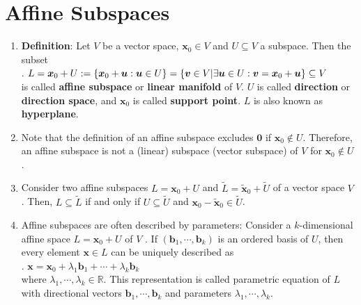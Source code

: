 \section{Affine Subspaces}

\begin{enumerate}
    \item \textbf{Definition}: Let $V$ be a vector space, $\bm{x}_0 \in V$ and $U \subseteq V$ a subspace. 
    Then the subset 
    \hfill \cite{mfml/book/mml/Deisenroth-Faisal-Ong}
    \\
    .\hfill
    $
        L 
        = \bm{x}_0 + U 
        := \left\{\bm{x}_0 + \bm{u} : \bm{u} \in  U\right\}
        = \left\{\bm{v} \in  V | \exists \bm{u} \in  U : \bm{v} = \bm{x}_0 + \bm{u}\right\} \subseteq V
    $
    \hfill \cite{mfml/book/mml/Deisenroth-Faisal-Ong}
    \\
    is called \textbf{affine subspace} or \textbf{linear manifold} of $V$.
    $U$ is called \textbf{direction} or \textbf{direction space}, and $\bm{x}_0$ is called \textbf{support point}.
    $L$ is also known as \textbf{hyperplane}.
    \hfill \cite{mfml/book/mml/Deisenroth-Faisal-Ong}

    \item Note that the definition of an affine subspace excludes $\bm{0}$ if $\bm{x}_0 \notin U$.
    Therefore, an affine subspace is not a (linear) subspace (vector subspace) of $V$ for $\bm{x}_0 \notin U$.
    \hfill \cite{mfml/book/mml/Deisenroth-Faisal-Ong}

    \item Consider two affine subspaces $L = \bm{x}_0 + U$ and $\tilde{L} = \tilde{\bm{x}}_0 + \tilde{U}$ of a vector space $V$ . 
    Then, $L \subseteq \tilde{L}$ if and only if $U \subseteq \tilde{U}$ and $\bm{x}_0 - \tilde{\bm{x}}_0 \in \tilde{U}$.
    \hfill \cite{mfml/book/mml/Deisenroth-Faisal-Ong}

    \item Affine subspaces are often described by parameters: Consider a $k$-dimensional affine space $L = \bm{x}_0 + U$ of $V$ . 
    If $(\bm{b}_1, \cdots , \bm{b}_k)$ is an ordered basis of $U$, then every element $\bm{x} \in L$ can be uniquely described as
    \hfill \cite{mfml/book/mml/Deisenroth-Faisal-Ong}
    \\
    .\hfill
    $
        \bm{x} = \bm{x}_0 + \lambda _1 \bm{b}_1 + \cdots + \lambda _k \bm{b}_k
    $
    \hfill \cite{mfml/book/mml/Deisenroth-Faisal-Ong}
    \\
    where $\lambda _1, \cdots , \lambda _k \in \mathbb{R}$. 
    This representation is called parametric equation of $L$ with directional vectors $\bm{b}_1, \cdots , \bm{b}_k$ and parameters $\lambda _1, \cdots , \lambda _k$.
    \hfill \cite{mfml/book/mml/Deisenroth-Faisal-Ong}


\end{enumerate}

